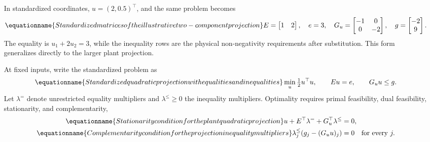 In standardized coordinates, $u=(2,0.5)^\top$, and the same problem becomes
\begin{equation}
\equationname{Standardized matrices of the illustrative two-component projection}
E=\begin{bmatrix}1&2\end{bmatrix},\quad e=3,\quad
G_u=\begin{bmatrix}-1&0\\0&-2\end{bmatrix},\quad
g=\begin{bmatrix}-2\\9\end{bmatrix}.
\end{equation}
The equality is $u_1+2u_2=3$, while the inequality rows are the physical non-negativity requirements after substitution. This form generalizes directly to the larger plant projection.

At fixed inputs, write the standardized problem as
\begin{equation}
\equationname{Standardized quadratic projection with equalities and inequalities}
\min_u\tfrac12u^\top u,\qquad Eu=e,\qquad G_uu\le g.
\label{eq:plant_standard_projection}
\end{equation}
Let $\lambda^=$ denote unrestricted equality multipliers and $\lambda^\le\ge0$ the inequality multipliers. Optimality requires primal feasibility, dual feasibility, stationarity, and complementarity,
\begin{align}
\equationname{Stationarity condition for the plant quadratic projection}
u+E^\top\lambda^=+G_u^\top\lambda^\le&=0,\\
\equationname{Complementarity condition for the projection inequality multipliers}
\lambda^\le_j(g_j-(G_uu)_j)&=0\quad\text{for every }j.
\label{eq:plant_projection_optimality}
\end{align}

